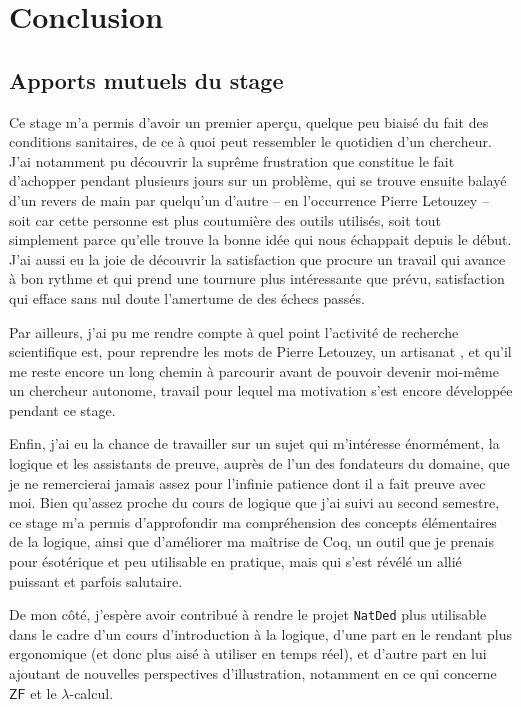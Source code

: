 \documentclass[a4paper]{article}
\newcommand{\ZF}{\mathsf{ZF}}
\theoremstyle{remark}
\theoremstyle{remark}
\theoremstyle{remark}
\theoremstyle{definition}
\theoremstyle{definition}
\theoremstyle{definition}
\begin{document}
\newpage


\section*{Conclusion}

\subsection*{Apports mutuels du stage}

Ce stage m'a permis d'avoir un premier aperçu, quelque peu biaisé du fait des conditions sanitaires, de ce à quoi peut ressembler le quotidien d'un chercheur. J'ai notamment pu découvrir la suprême frustration que constitue le fait d'achopper pendant plusieurs jours sur un problème, qui se trouve ensuite balayé d'un revers de main par quelqu'un d'autre -- en l'occurrence Pierre Letouzey -- soit car cette personne est plus coutumière des outils utilisés, soit tout simplement parce qu'elle trouve la bonne idée qui nous échappait depuis le début. J'ai aussi eu la joie de découvrir la satisfaction que procure un travail qui avance à bon rythme et qui prend une tournure plus intéressante que prévu, satisfaction qui efface sans nul doute l'amertume de des échecs passés.

Par ailleurs, j'ai pu me rendre compte à quel point l'activité de recherche scientifique est, pour reprendre les mots de Pierre Letouzey, un \og artisanat \fg{}, et qu'il me reste encore un long chemin à parcourir avant de pouvoir devenir moi-même un chercheur autonome, travail pour lequel ma motivation s'est encore développée pendant ce stage.

Enfin, j'ai eu la chance de travailler sur un sujet qui m'intéresse énormément, la logique et les assistants de preuve, auprès de l'un des fondateurs du domaine, que je ne remercierai jamais assez pour l'infinie patience dont il a fait preuve avec moi. Bien qu'assez proche du cours de logique que j'ai suivi au second semestre, ce stage m'a permis d'approfondir ma compréhension des concepts élémentaires de la logique, ainsi que d'améliorer ma maîtrise de Coq, un outil que je prenais pour ésotérique et peu utilisable en pratique, mais qui s'est révélé un allié puissant et parfois salutaire.
\medskip

De mon côté, j'espère avoir contribué à rendre le projet \verb+NatDed+ plus utilisable dans le cadre d'un cours d'introduction à la logique, d'une part en le rendant plus ergonomique (et donc plus aisé à utiliser en temps réel), et d'autre part en lui ajoutant de nouvelles perspectives d'illustration, notamment en ce qui concerne $\ZF$ et le $\lambda$-calcul.
\end{document}
